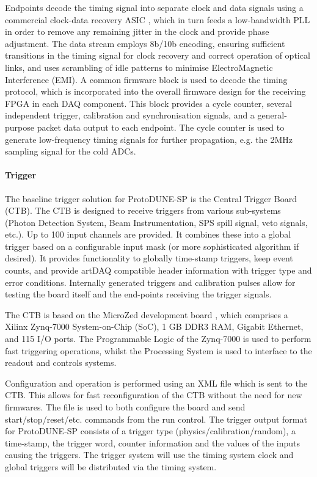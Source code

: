 Endpoints decode the timing signal into separate clock and data
signals using a commercial clock-data recovery ASIC \cite{siliconlabs:Si5344}, which in turn
feeds a low-bandwidth PLL in order to remove any remaining jitter in
the clock and provide phase adjustment. The data stream employs 8b/10b
encoding, ensuring sufficient transitions in the timing signal for clock
recovery and correct operation of optical links, and uses scrambling
of idle patterns to minimise ElectroMagnetic Interference (EMI).
 A common firmware block is used to
decode the timing protocol, which is incorporated into the overall
firmware design for the receiving FPGA in each DAQ component. This
block provides a cycle counter, several independent trigger, calibration and 
synchronisation signals, and a general-purpose packet data output to each endpoint.
The cycle counter is used to generate low-frequency timing signals for
further propagation, e.g. the 2MHz sampling signal for the cold ADCs.

\paragraph{Trigger}

The baseline trigger solution for ProtoDUNE-SP is the Central Trigger Board
(CTB). The CTB is designed to receive triggers from various sub-systems
(Photon Detection System, Beam Instrumentation, SPS spill signal, veto
signals, etc.).  Up to 100 input channels are provided.  It combines
these into a global trigger based on a configurable input mask (or
more sophisticated algorithm if desired).  It provides functionality
to globally time-stamp triggers, keep event counts, and provide artDAQ
compatible header information with trigger type and error conditions.
Internally generated triggers and calibration pulses allow for testing
the board itself and the end-points receiving the trigger signals.

The CTB is based on the MicroZed development board \cite{avnet:microzed}, which comprises a
Xilinx Zynq-7000 System-on-Chip (SoC), 1 GB DDR3 RAM, Gigabit Ethernet,
and 115 I/O ports.  The Programmable Logic of the Zynq-7000 is used to
perform fast triggering operations, whilst the Processing System is used
to interface to the readout and controls systems.

Configuration and operation is performed using an XML file which is sent
to the CTB.  This allows for fast reconfiguration of the CTB without
the need for new firmwares.  The file is used to both configure the board
and send start/stop/reset/etc. commands from the run control.
The trigger output format for ProtoDUNE-SP consists of a trigger type (physics/calibration/random),
a time-stamp, the trigger word, counter information and the values 
of the inputs causing the triggers.  
The trigger system will use the timing system clock and global triggers will be
distributed via the timing system.  


